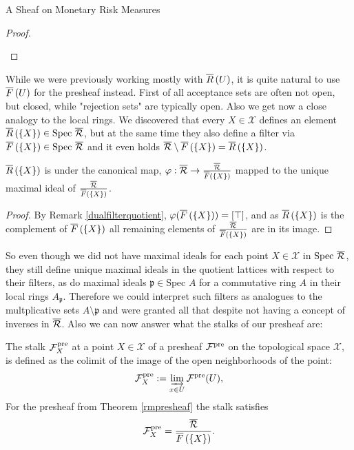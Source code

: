 \begin{subsection}{A Sheaf on Monetary Risk Measures}
\begin{proof}
\begin{itemize}
        \end{itemize}
    \end{proof}
    While we were previously working mostly with \( \overline{R}\left (U \right) \), it is quite natural to use \( \overline{F}\left (U \right) \) for the presheaf instead.
    First of all acceptance sets are often not open, but closed, while "rejection sets" are typically open. Also we get now a close analogy
    to the local rings. We discovered that every \( X \in \mathcal{X} \) defines an element \( \overline{R}\left (\{X\} \right) \in \text{Spec } \overline{\mathcal{R}} \), but at the same time 
    they also define a filter via \( \overline{F}\left (\{X\} \right) \in \text{Spec } \overline{\mathcal{R}} \) and it even holds \( \overline{\mathcal{R}} \setminus \overline{F}\left (\{X\} \right) = \overline{R}\left (\{X\} \right) \).
    \begin{proposition}
        \( \overline{R}\left (\{X\} \right) \) is under the canonical map, \( \varphi : \overline{\mathcal{R}} \to \frac{\overline{\mathcal{R}}}{\overline{F}\left (\{X\} \right)} \) mapped to the unique maximal ideal
        of \( \frac{\overline{\mathcal{R}}}{\overline{F}\left (\{X\} \right)} \).
    \end{proposition}
    \begin{proof}
        By Remark \ref{dualfilterquotient}, \( \varphi(\overline{F}\left (\{X\} \right)) = [\top] \), and as \( \overline{R}\left (\{X\} \right) \) is the complement of \( \overline{F}\left (\{X\} \right) \)
        all remaining elements of \( \frac{\overline{\mathcal{R}}}{\overline{F}\left (\{X\} \right)} \) are in its image.
    \end{proof}
    So even though we did not have maximal ideals for each point \( X \in \mathcal{X} \) in \( \text{Spec } \overline{\mathcal{R}} \), they still define unique maximal ideals in the quotient lattices
    with respect to their filters, as do maximal ideals \( \mathfrak{p} \in \text{Spec } A \) for a commutative ring \( A \) in their local rings \( A_{\mathfrak{p}} \).
    Therefore we could interpret such filters as analogues to the multplicative sets \( A \setminus \mathfrak{p} \) and were granted all that despite not having a concept of inverses in \( \overline{\mathcal{R}} \).
    \newline
    Also we can now answer what the stalks of our presheaf are:
    \begin{corollary}
        The stalk \( \mathcal{F}^{\text{pre}}_X \) at a point \( X \in \mathcal{X} \) of a presheaf \( \mathcal{F}^{\text{pre}} \) on the topological space \( \mathcal{X} \),
        is defined as the colimit of the image of the open neighborhoods of the point:
        \[ 
           \mathcal{F}^{\text{pre}}_{X} := \varinjlim_{x \in U} \mathcal{F}^{\text{pre}}(U),
        \]
        For the presheaf from Theorem \ref{rmpresheaf} the stalk satisfies
        \[
            \mathcal{F}^{\text{pre}}_{X} = \frac{\overline{\mathcal{R}}}{\overline{F}\left (\{X\} \right)}.
\]
\end{corollary}
\end{subsection}
